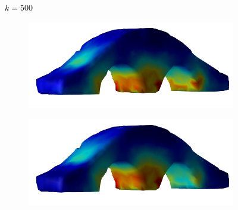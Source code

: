 \documentclass[11pt,titlepage]{article}
\begin{document}
\begin{figure}[!htbp]
\begin{center}
        $k=500$
        \quad
        \begin{subfigure}[b]{0.4\textwidth}
            \centering
            \includegraphics[width=\textwidth]{jacopt_vm/resized/archbridge_tiny_500}
        \end{subfigure}
        \begin{subfigure}[b]{0.4\textwidth}
            \centering
            \includegraphics[width=\textwidth]{soropt_vm/resized/archbridge_tiny_500}
        \end{subfigure}\\ 



\end{center}
\end{figure}
\end{document}
